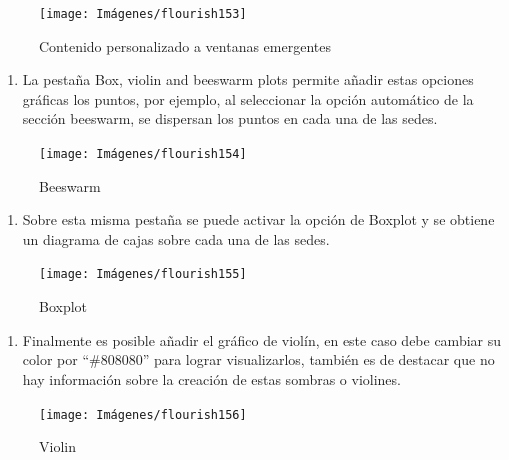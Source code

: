 \documentclass[
]{book}
\providecommand{\tightlist}{%
  \setlength{\itemsep}{0pt}\setlength{\parskip}{0pt}}
\begin{document}
\begin{figure}

{\centering \texttt{[image: Imágenes/flourish153]} 

}

\caption{Contenido personalizado a ventanas emergentes}\label{fig:paso7puntosflourish-fig}
\end{figure}

\begin{enumerate}
\def\labelenumi{\arabic{enumi}.}
\setcounter{enumi}{7}
\tightlist
\item
  La pestaña Box, violin and beeswarm plots permite añadir estas opciones gráficas los puntos, por ejemplo, al seleccionar la opción automático de la sección beeswarm, se dispersan los puntos en cada una de las sedes.
\end{enumerate}

\begin{figure}

{\centering \texttt{[image: Imágenes/flourish154]} 

}

\caption{Beeswarm}\label{fig:paso8puntosflourish-fig}
\end{figure}

\begin{enumerate}
\def\labelenumi{\arabic{enumi}.}
\setcounter{enumi}{8}
\tightlist
\item
  Sobre esta misma pestaña se puede activar la opción de Boxplot y se obtiene un diagrama de cajas sobre cada una de las sedes.
\end{enumerate}

\begin{figure}

{\centering \texttt{[image: Imágenes/flourish155]} 

}

\caption{Boxplot}\label{fig:paso9puntosflourish-fig}
\end{figure}

\begin{enumerate}
\def\labelenumi{\arabic{enumi}.}
\setcounter{enumi}{9}
\tightlist
\item
  Finalmente es posible añadir el gráfico de violín, en este caso debe cambiar su color por ``\#808080'' para lograr visualizarlos, también es de destacar que no hay información sobre la creación de estas sombras o violines.
\end{enumerate}

\begin{figure}

{\centering \texttt{[image: Imágenes/flourish156]} 

}

\caption{Violin}\label{fig:paso10puntosflourish-fig}
\end{figure}
\end{document}
